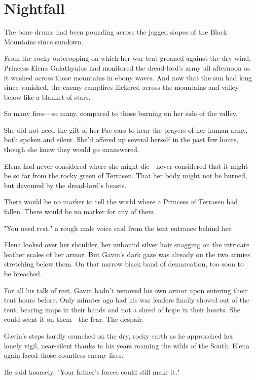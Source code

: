 
\chapter*{Nightfall}

The bone drums had been pounding across the jagged slopes of the Black Mountains since sundown.

From the rocky outcropping on which her war tent groaned against the dry wind, Princess Elena Galathynius had monitored the dread-lord's army all afternoon as it washed across those mountains in ebony waves. And now that the sun had long since vanished, the enemy campfires flickered across the mountains and valley below like a blanket of stars.

So many fires---so many, compared to those burning on her side of the valley.

She did not need the gift of her Fae ears to hear the prayers of her human army, both spoken and silent. She'd offered up several herself in the past few hours, though she knew they would go unanswered.

Elena had never considered where she might die---never considered that it might be so far from the rocky green of Terrasen. That her body might not be burned, but devoured by the dread-lord's beasts.

There would be no marker to tell the world where a Princess of Terrasen had fallen. There would be no marker for any of them.

"You need rest," a rough male voice said from the tent entrance behind her.

Elena looked over her shoulder, her unbound silver hair snagging on the intricate leather scales of her armor. But Gavin's dark gaze was already on the two armies stretching below them. On that narrow black band of demarcation, too soon to be breached.

For all his talk of rest, Gavin hadn't removed his own armor upon entering their tent hours before. Only minutes ago had his war leaders finally shoved out of the tent, bearing maps in their hands and not a shred of hope in their hearts. She could scent it on them---the fear. The despair.

Gavin's steps hardly crunched on the dry, rocky earth as he approached her lonely vigil, near-silent thanks to his years roaming the wilds of the South. Elena again faced those countless enemy fires.

He said hoarsely, "Your father's forces could still make it."

